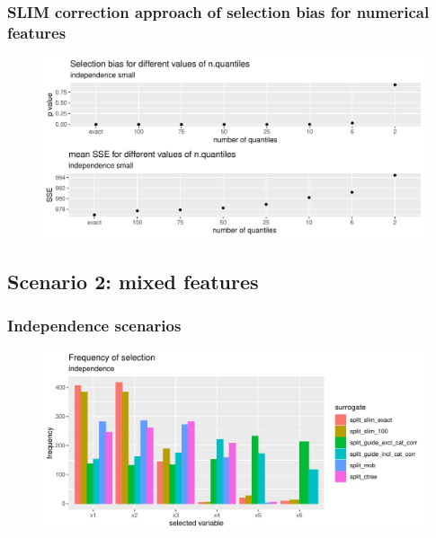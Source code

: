 \subsubsection{SLIM correction approach of selection bias for numerical features}
\begin{figure}
    \includegraphics[width=16cm]{Figures/simulations/batchtools/selection_bias_slim/independence_small.pdf}
\end{figure} 


\subsection{Scenario 2: mixed features}
\subsubsection{Independence scenarios}
\begin{figure}
    \includegraphics[width=16cm]{Figures/simulations/batchtools/selection_bias_general_10_01/independence.pdf}
\end{figure} 


